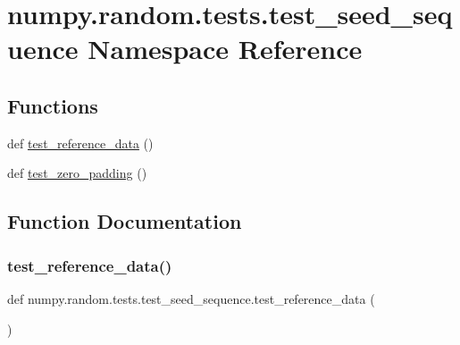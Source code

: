\hypertarget{namespacenumpy_1_1random_1_1tests_1_1test__seed__sequence}{}\section{numpy.\+random.\+tests.\+test\+\_\+seed\+\_\+sequence Namespace Reference}
\label{namespacenumpy_1_1random_1_1tests_1_1test__seed__sequence}
\subsection*{Functions}
\begin{DoxyCompactItemize}
\item 
def \hyperlink{namespacenumpy_1_1random_1_1tests_1_1test__seed__sequence_aafd6a4f73cda1a3b926cb35596e233b1}{test\+\_\+reference\+\_\+data} ()
\item 
def \hyperlink{namespacenumpy_1_1random_1_1tests_1_1test__seed__sequence_a260e04e8b457c2016230df4ed7630a07}{test\+\_\+zero\+\_\+padding} ()
\end{DoxyCompactItemize}


\subsection{Function Documentation}
\mbox{\label{namespacenumpy_1_1random_1_1tests_1_1test__seed__sequence_aafd6a4f73cda1a3b926cb35596e233b1}} 
\subsubsection{\texorpdfstring{test\+\_\+reference\+\_\+data()}{test\_reference\_data()}}
{\footnotesize\ttfamily def numpy.\+random.\+tests.\+test\+\_\+seed\+\_\+sequence.\+test\+\_\+reference\+\_\+data (\begin{DoxyParamCaption}{ }\end{DoxyParamCaption})}


